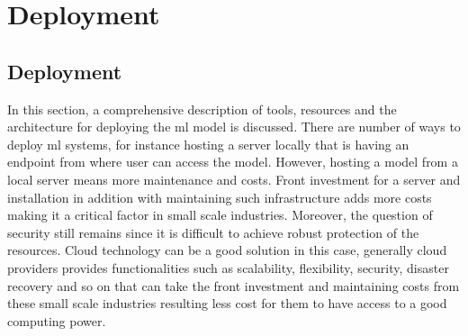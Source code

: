 \chapter{Deployment \label{Chapter_deployment}}

\section{Deployment\label{deployment_methods}}

In this section, a comprehensive description of tools, resources and the architecture for deploying the \acrshort{ml} model is discussed. There are number of ways to deploy \acrshort{ml} systems, for instance hosting a server locally that is having an endpoint from where user can access the model. However, hosting a model from a local server means more maintenance and costs. Front investment for a server and installation in addition with maintaining such infrastructure adds more costs making it a critical factor in small scale industries. Moreover, the question of security still remains since it is difficult to achieve robust protection of the resources. Cloud technology can be a good solution in this case, generally cloud providers provides functionalities such as scalability, flexibility, security, disaster recovery and so on that can take the front investment and maintaining costs from these small scale industries resulting less cost for them to have access to a good computing power. 


